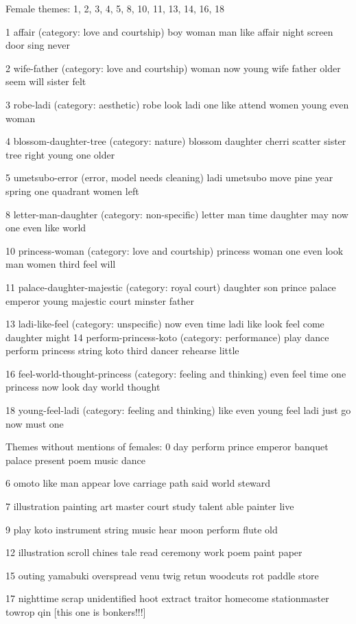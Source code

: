 \documentclass[12pt]{article}
\begin{document}
\begin{flushleft}
\begin{spacing}{2.0}
Female themes: 
1, 2, 3, 4, 5, 8, 10, 11, 13, 14, 16, 18

1 affair (category: love and courtship)
boy woman man like affair night screen door sing never

2 wife-father (category: love and courtship)
woman now young wife father older seem will sister felt

3 robe-ladi (category: aesthetic)
robe look ladi one like attend women young even woman 

4 blossom-daughter-tree (category: nature)
blossom daughter cherri scatter sister tree right young one older

5 umetsubo-error (error, model needs cleaning)
ladi umetsubo move pine year spring one quadrant women left 

8 letter-man-daughter (category: non-specific)
letter man time daughter may now one even like world 

10 princess-woman (category: love and courtship)
princess woman one even look man women third feel will

11 palace-daughter-majestic (category: royal court)
daughter son prince palace emperor young majestic court minster father

13 ladi-like-feel (category: unspecific) 
now even time ladi like look feel come daughter might
14 perform-princess-koto (category: performance) 
play dance perform princess string koto third dancer rehearse little

16 feel-world-thought-princess (category: feeling and thinking) 
even feel time one princess now look day world thought

18 young-feel-ladi (category: feeling and thinking) 
like even young feel ladi just go now must one 

Themes without mentions of females: 
0 day perform prince emperor banquet palace present poem music dance 

6 omoto like man appear love carriage path said world steward

7 illustration painting art master court study talent able painter live 

9 play koto instrument string music hear moon perform flute old

12 illustration scroll chines tale read ceremony work poem paint paper

15 outing yamabuki overspread venu twig retun woodcuts rot paddle store

17 nighttime scrap unidentified hoot extract traitor homecome stationmaster towrop qin [this one is bonkers!!!]


\end{spacing}
\end{flushleft}
\end{document}
